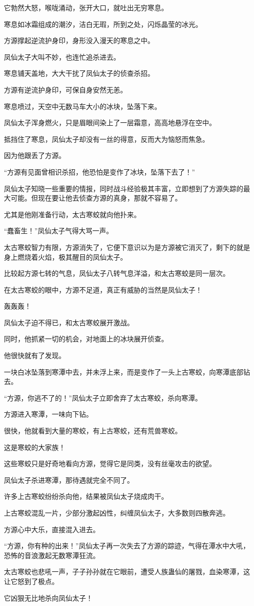 \begin{this_body}
它勃然大怒，喉咙涌动，张开大口，就吐出无穷寒息。

寒息如冰霜组成的潮汐，洁白无瑕，所到之处，闪烁晶莹的冰光。

方源撑起逆流护身印，身形没入漫天的寒息之中。

凤仙太子大叫不妙，也连忙追杀进去。

寒息铺天盖地，大大干扰了凤仙太子的侦查杀招。

方源有逆流护身印，可保自身安然无恙。

寒息喷过，天空中无数马车大小的冰块，坠落下来。

凤仙太子浑身燃火，只是眉眼间染上了一层霜意，高高地悬浮在空中。

抵挡住了寒息，凤仙太子却没有一丝的得意，反而大为恼怒而焦急。

因为他跟丢了方源。

“方源有见面曾相识杀招，他恐怕是变作了冰块，坠落下去了！”

凤仙太子知晓一些重要的情报，同时战斗经验极其丰富，立即想到了方源失踪的最大可能。但现在要让他去侦查方源的真身，那就不容易了。

尤其是他刚准备行动，太古寒蛟就向他扑来。

“蠢畜生！”凤仙太子气得大骂一声。

太古寒蛟智力有限，方源消失了，它便下意识以为是方源被它消灭了，剩下的就是身上燃烧着火焰，极其醒目的凤仙太子。

比较起方源七转的气息，凤仙太子八转气息洋溢，和太古寒蛟是同一层次。

在太古寒蛟的眼中，方源不足道，真正有威胁的当然是凤仙太子！

轰轰轰！

凤仙太子迫不得已，和太古寒蛟展开激战。

同时，他抓紧一切的机会，对地面上的冰块展开侦查。

他很快就有了发现。

一块白冰坠落到寒潭中去，并未浮上来，而是变作了一头上古寒蛟，向寒潭底部钻去。

“方源，你逃不了的！”凤仙太子立即舍弃了太古寒蛟，杀向寒潭。

方源进入寒潭，一味向下钻。

很快，他就看到大量的寒蛟，有上古寒蛟，还有荒兽寒蛟。

这是寒蛟的大家族！

这些寒蛟只是好奇地看向方源，觉得它是同类，没有丝毫攻击的欲望。

凤仙太子杀进寒潭，那待遇就完全不同了。

许多上古寒蛟纷纷杀向他，结果被凤仙太子烧成肉干。

上古寒蛟混乱一片，少部分激起凶性，纠缠凤仙太子，大多数则四散奔逃。

方源心中大乐，直接混入进去。

“方源，你有种的出来！”凤仙太子再一次失去了方源的踪迹，气得在潭水中大吼，恐怖的音浪激起无数寒潭狂流。

太古寒蛟也悲吼一声，子子孙孙就在它眼前，遭受人族蛊仙的屠戮，血染寒潭，这让它怒到了极点。

它凶狠无比地杀向凤仙太子！

\end{this_body}

